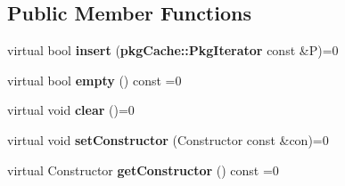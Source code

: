 \subsection*{\-Public \-Member \-Functions}
\begin{DoxyCompactItemize}
\item 
virtual bool {\bfseries insert} ({\bf pkg\-Cache\-::\-Pkg\-Iterator} const \&\-P)=0\label{classAPT_1_1PackageContainerInterface_a3af7ce44ca2fd592bc5ea3cfe1cdd738}

\item 
virtual bool {\bfseries empty} () const =0\label{classAPT_1_1PackageContainerInterface_ae22f66718bb2160cb671c4355ceeb1a2}

\item 
virtual void {\bfseries clear} ()=0\label{classAPT_1_1PackageContainerInterface_a5eeb94d22b8366d1b68d0614384802fe}

\item 
virtual void {\bfseries set\-Constructor} (\-Constructor const \&con)=0\label{classAPT_1_1PackageContainerInterface_a89796ec9878d04cf60a6a033999dfb3e}

\item 
virtual \-Constructor {\bfseries get\-Constructor} () const =0\label{classAPT_1_1PackageContainerInterface_abb3e417a6379a97a15763fc9a764beae}

\end{DoxyCompactItemize}
